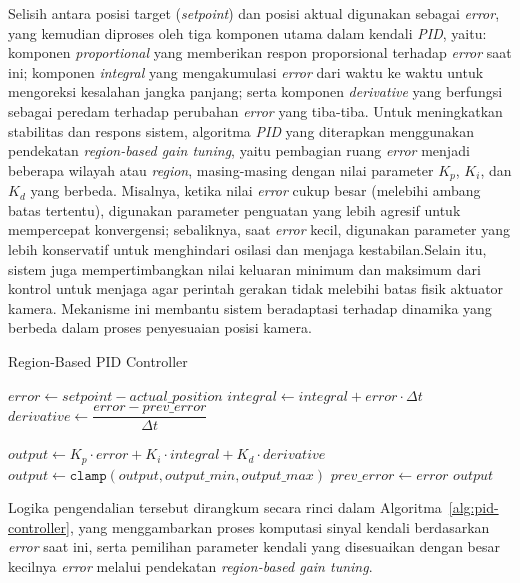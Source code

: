 Selisih antara posisi target (\emph{setpoint}) dan posisi aktual digunakan sebagai \emph{error}, yang kemudian diproses oleh tiga komponen utama dalam kendali \emph{PID}, yaitu: komponen \emph{proportional} yang memberikan respon proporsional terhadap \emph{error} saat ini; komponen \emph{integral} yang mengakumulasi \emph{error} dari waktu ke waktu untuk mengoreksi kesalahan jangka panjang; serta komponen \emph{derivative} yang berfungsi sebagai peredam terhadap perubahan \emph{error} yang tiba-tiba. Untuk meningkatkan stabilitas dan respons sistem, algoritma \emph{PID} yang diterapkan menggunakan pendekatan \emph{region-based gain tuning}, yaitu pembagian ruang \emph{error} menjadi beberapa wilayah atau \emph{region}, masing-masing dengan nilai parameter $K_p$, $K_i$, dan $K_d$ yang berbeda. Misalnya, ketika nilai \emph{error} cukup besar (melebihi ambang batas tertentu), digunakan parameter penguatan yang lebih agresif untuk mempercepat konvergensi; sebaliknya, saat \emph{error} kecil, digunakan parameter yang lebih konservatif untuk menghindari osilasi dan menjaga kestabilan.Selain itu, sistem juga mempertimbangkan nilai keluaran minimum dan maksimum dari kontrol untuk menjaga agar perintah gerakan tidak melebihi batas fisik aktuator kamera. Mekanisme ini membantu sistem beradaptasi terhadap dinamika yang berbeda dalam proses penyesuaian posisi kamera.

\vspace{1ex}
\begin{algorithm}[H]
\caption{Region-Based PID Controller}
\label{alg:pid-controller}

$error \gets setpoint - actual\_position$\;
$integral \gets integral + error \cdot \Delta t$\;
$derivative \gets \dfrac{error - prev\_error}{\Delta t}$\;


$output \gets K_p \cdot error + K_i \cdot integral + K_d \cdot derivative$\;
$output \gets \texttt{clamp}(output, output\_min, output\_max)$\;
$prev\_error \gets error$\;
\Return $output$\;
\end{algorithm}

Logika pengendalian tersebut dirangkum secara rinci dalam Algoritma~\ref{alg:pid-controller}, yang menggambarkan proses komputasi sinyal kendali berdasarkan \emph{error} saat ini, serta pemilihan parameter kendali yang disesuaikan dengan besar kecilnya \emph{error} melalui pendekatan \emph{region-based gain tuning}.



